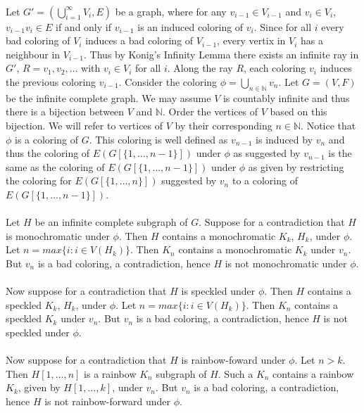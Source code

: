 \documentclass[letterpaper,12pt,oneside,onecolumn]{article}
\newcommand{\N}{\mathbb{N}} \newcommand{\R}{\mathbb{R}}
\begin{document}
\paragraph{}
Let $G' = (\bigcup_{i=1}^\infty V_i, E)$ be a graph, where for any $v_{i-1} \in V_{i-1}$ and $ v_i \in V_i$, $v_{i-1}v_i \in E$ if and only if $v_{i-1}$ is an induced coloring of $v_i$. Since for all $i$ every bad coloring of $V_i$ induces a bad coloring of $V_{i-1}$, every vertix in $V_i$ has a neighbour in $V_{i-1}$. Thus by Konig's Infinity Lemma there exists an infinite ray in $G'$, $R=v_1,v_2,\dots$ with $v_i \in V_i$ for all $i$. Along the ray $R$, each coloring $v_i$ induces the previous coloring $v_{i-1}$. Consider the coloring $\phi = \bigcup_{n \in \N} v_n$. Let $G=(V,F)$ be the infinite complete graph. We may assume $V$ is countably infinite and thus there is a bijection between $V$ and $\N$. Order the vertices of $V$ based on this bijection. We will refer to vertices of $V$ by their corresponding $n \in \N$. Notice that $\phi$ is a coloring of $G$. This coloring is well defined as $v_{n-1}$ is induced by $v_n$ and thus the coloring of $E(G[\{1,\dots,n-1\}])$ under $\phi$ as suggested by $v_{n-1}$ is the same as the coloring of $E(G[\{1,\dots,n-1\}])$ under $\phi$ as given by restricting the coloring for $E(G[\{1,\dots,n\}])$ suggested by $v_n$ to a coloring of $E(G[\{1,\dots, n-1\}])$. 
\paragraph{}
Let $H$ be an infinite complete subgraph of $G$. Suppose for a contradiction that $H$ is monochromatic under $\phi$. Then $H$ contains a monochromatic $K_k$, $H_k$, under $\phi$. Let $n = max\{ i : i \in V(H_k)\}$. Then $K_n$  contains a monochromatic $K_k$ under $v_n$. But $v_n$ is a bad coloring, a contradiction, hence $H$ is not monochromatic under $\phi$.
\paragraph{}
Now suppose for a contradiction that $H$ is speckled under $\phi$. Then $H$ contains a speckled $K_k$, $H_k$, under $\phi$. Let $n = max\{ i : i \in V(H_k)\}$. Then $K_n$  contains a speckled $K_k$ under $v_n$. But $v_n$ is a bad coloring, a contradiction, hence $H$ is not speckled under $\phi$.
\paragraph{}
Now suppose for a contradiction that $H$ is rainbow-foward under $\phi$. Let $n > k$. Then $H[1,\dots,n]$ is a rainbow $K_n$ subgraph of $H$. Such a $K_n$ contains a rainbow $K_k$, given by $H[1,\dots,k]$, under $v_n$. But $v_n$ is a bad coloring, a contradiction, hence $H$ is not rainbow-forward under $\phi$.
\end{document}
